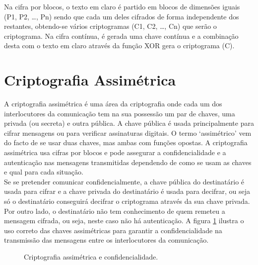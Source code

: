 \documentclass[a4paper,11pt,openright,oneside]{report}
\begin{document}
Na cifra por blocos, o texto em claro é partido em blocos de dimensões iguais (P1, P2, …, Pn) sendo que cada um deles cifrados de forma independente dos restantes, obtendo-se vários criptogramas (C1, C2, …, Cn) que serão o criptograma. Na cifra contínua, é gerada uma chave contínua e a combinação desta com o texto em claro através da função XOR gera o criptograma (C).

\section{Criptografia Assimétrica}
\label{chap.assimétrica}

A criptografia assimétrica é uma área da criptografia onde cada um dos interlocutores da comunicação tem na sua possessão um par de chaves, uma privada (ou secreta) e outra pública. A chave pública é usada principalmente para cifrar mensagens ou para verificar assinaturas digitais. O termo ‘assimétrico’ vem do facto de se usar duas chaves, mas ambas com funções opostas. A criptografia assimétrica usa cifras por blocos e pode assegurar a confidencialidade e a autenticação nas mensagens transmitidas dependendo de como se usam as chaves e qual para cada situação.\\

Se se pretender comunicar confidencialmente, a chave pública do destinatário é usada para cifrar e a chave privada do destinatário é usada para decifrar, ou seja só o destinatário conseguirá decifrar o criptograma através da sua chave privada. Por outro lado, o destinatário não tem conhecimento de quem remeteu a mensagem cifrada, ou seja, neste caso não há autenticação. A figura \ref{fig:crypto3} ilustra o uso correto das chaves assimétricas para garantir a confidencialidade na transmissão das mensagens entre os interlocutores da comunicação.

\begin{figure}[ht]
\center
{}
\caption{Criptografia assimétrica e confidencialidade.}
\label{fig:crypto3}
\end{figure}
\end{document}
